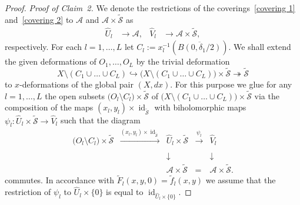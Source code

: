 \documentclass[11pt,twoside]{amsart}
\theoremstyle{plain}
\newcommand{\Am}{\mathcal{A}}
\newcommand{\Sm}{\mathcal{S}}
\DeclareMathOperator{\id}{id}
\newcommand{\dfx}{dx}
\begin{document}
\begin{proof}
\emph{Proof of Claim~2.}
We denote the restrictions of the coverings~\eqref{covering 1} and~\eqref{covering 2} to $\Am$ and $\Am\times\tilde{\Sm}$ as
\begin{align*}
\widehat{U}_l&\to\Am,& \widehat{V}_l&\to\Am\times\tilde{\Sm},
\end{align*}
respectively. For each $l=1,\ldots,L$ let $C_l:=x_l^{-1} (\overline{B(0,\delta_1/2)})$.
We shall extend the given deformations of $O_1,\ldots,O_L$ by the trivial deformation
$$X\setminus(C_1\cup\ldots\cup C_L)\hookrightarrow\big(X\setminus(C_1\cup\ldots\cup C_L)\big)\times\tilde{\Sm}\twoheadrightarrow\tilde{\Sm}$$
to $ x $-deformations of the global pair $(X,\dfx)$. For this purpose we glue for any $l=1,\ldots,L$ the open subsets $\big(O_l\setminus C_l\big)\times\tilde{\Sm}$ of $\big(X\setminus(C_1\cup\ldots\cup C_L)\big)\times\tilde{\Sm}$ via the composition of the maps $(x_l,y_l)\times\id_{\tilde{\Sm}}$ with biholomorphic maps $\psi_l:\widehat U_l\times\tilde{\Sm}\to\widehat V_l$ such that the diagram
$$\begin{array}{ccccc}
\big(O_l\setminus C_l\big)\times\tilde{\Sm}&\xrightarrow{(x_l,y_l)\times\id_{\tilde{\Sm}}}&\widehat{U}_l\times\tilde{\Sm}&\xrightarrow{\psi_l}&\widehat{V}_l\\
\\
&&\downarrow&&\downarrow\\
&&\Am\times\tilde{\Sm}&=&\Am\times\tilde{\Sm}.
\end{array}$$
commutes. In accordance with $\tilde{F}_l(x,y,0)=\tilde{f}_l(x,y)$ we assume that the restriction of $\psi_l$ to $\widehat{U}_l\times\{0\}$ is equal to $\id_{\widehat{U}_l\times\{0\}}$.


\end{proof}
\end{document}
